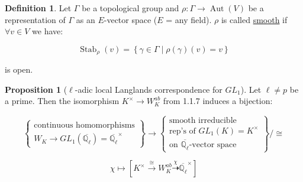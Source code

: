 \documentclass{article}
\theoremstyle{definition}
\newtheorem*{definition}{Definition}
\numberwithin{theorem}{subsection}
\newtheorem{proposition}[theorem]{Proposition}
\begin{document}
    \begin{definition}
        Let \(\Gamma\) be a topological group and \(\rho: \Gamma \to \operatorname{Aut} (V)\) be a representation of \(\Gamma\) as an \(E\)-vector space (\(E\) = any field). \(\rho\) is called \underline{smooth} if \(\forall v\in V\) we have:

        \[
            \operatorname{Stab}_{\rho}(v) = \left\{ \gamma \in \Gamma \mid \rho (\gamma)(v) = v \right\} 
        \]

        is open.
    \end{definition}

    \begin{proposition}
        [\(\ell\)-adic local Langlands correspondence for \(GL_1\)]

        Let \(\ell \neq p\) be a prime. Then the isomorphism \(K^\times \to W^{ab}_{K}\) from 1.1.7 induces a bijection:
        
        \[
            \begin{Bmatrix}
                \text{continuous homomorphisms} \\ W_K \to GL_1(\overline{\mathbb{Q}_\ell}) = \overline{\mathbb{Q}_{\ell}}^\times 
            \end{Bmatrix} \to \begin{Bmatrix}
                \text{smooth irreducible} \\ \text{rep's of } GL_1(K) = K^\times \\ \text{on } \overline{\mathbb{Q}_{\ell}}\text{-vector space}
            \end{Bmatrix} / \cong
        \]

        \[
            \chi \mapsto \left[ K^\times \xrightarrow{\cong} W_K^{ab} \overset{\chi}{\dashrightarrow} \overline{\mathbb{Q}_{\ell}}^\times \right] 
        \]

        \begin{center}
        \end{center}

    \end{proposition}
\end{document}
